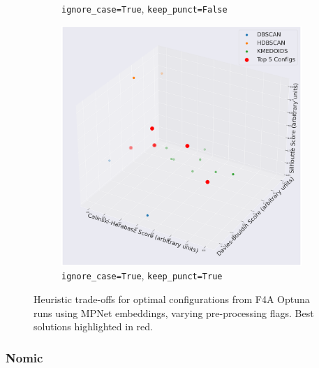 \documentclass[10pt,oneside]{report}
\begin{document}
\begin{figure}[H]
\begin{subfigure}[b]{0.48\textwidth}
        \caption{\texttt{ignore\_case=True}, \texttt{keep\_punct=False}}
        \label{fig:mpnet_tf_f4a_config} %
    \end{subfigure}
    \hfill
    \begin{subfigure}[b]{0.48\textwidth}
        \centering
        \includegraphics[width=\textwidth]{./images/mpnet_true-true.png}
        \caption{\texttt{ignore\_case=True}, \texttt{keep\_punct=True}}
        \label{fig:mpnet_tt_f4a_config} %
    \end{subfigure}
    \caption{Heuristic trade-offs for optimal configurations from F4A Optuna runs using MPNet embeddings, varying pre-processing flags. Best solutions highlighted in red.}
    \label{fig:mpnet_f4a_config_appendix} %
\end{figure}

\subsubsection{Nomic}
\end{document}
